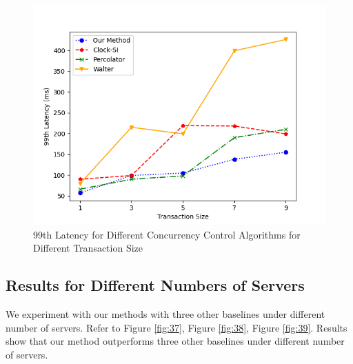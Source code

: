 \begin{figure}[H]
    \centering
    \includegraphics[width=0.8\linewidth]{figure/36.png}
    \caption{99th Latency for Different Concurrency Control Algorithms for Different Transaction Size}
    \label{fig:36}
\end{figure}








\subsection{Results for Different Numbers of Servers}

We experiment with our methods with three other baselines under different number of servers. Refer to Figure \ref{fig:37}, Figure \ref{fig:38}, Figure \ref{fig:39}. Results show that our method outperforms three other baselines under different number of servers.

